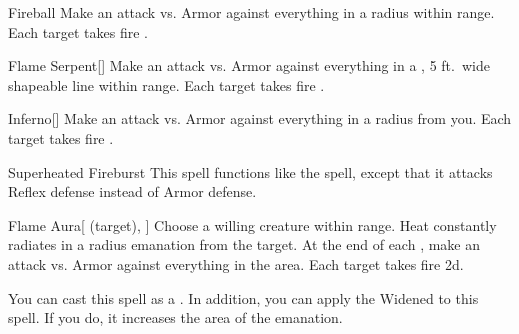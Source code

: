 \lowercase{\hypertarget{spell:Fireball}{}}\label{spell:Fireball}
\begin{ability}[\nth{3}]{\hypertarget{spell:Fireball}{Fireball}}
Make an attack vs. Armor against everything in a \areamed radius within \rngmed range.
\hit Each target takes fire .
\end{ability}
\vspace{0.25em}



\lowercase{\hypertarget{spell:Flame Serpent}{}}\label{spell:Flame Serpent}
\begin{ability}[\nth{3}]{\hypertarget{spell:Flame Serpent}{Flame Serpent}}[]
Make an attack vs. Armor against everything in a \arealarge, 5 ft.\ wide shapeable line within \rngmed range.
\hit Each target takes fire .
\end{ability}
\vspace{0.25em}



\lowercase{\hypertarget{spell:Inferno}{}}\label{spell:Inferno}
\begin{ability}[\nth{3}]{\hypertarget{spell:Inferno}{Inferno}}[]
Make an attack vs. Armor against everything in a \arealarge radius from you.
\hit Each target takes fire .
\end{ability}
\vspace{0.25em}



\lowercase{\hypertarget{spell:Superheated Fireburst}{}}\label{spell:Superheated Fireburst}
\begin{ability}[\nth{3}]{\hypertarget{spell:Superheated Fireburst}{Superheated Fireburst}}
This spell functions like the  spell, except that it attacks Reflex defense instead of Armor defense.
\end{ability}
\vspace{0.25em}



\lowercase{\hypertarget{spell:Flame Aura}{}}\label{spell:Flame Aura}
\begin{ability}[\nth{4}]{\hypertarget{spell:Flame Aura}{Flame Aura}}[ (target), ]
Choose a willing creature within \rngclose range.
Heat constantly radiates in a \areamed radius emanation from the target.
At the end of each , make an attack vs. Armor against everything in the area.
\hit Each target takes fire  \minus2d.

You can cast this spell as a .
In addition, you can apply the Widened  to this spell.
If you do, it increases the area of the emanation.
\end{ability}
\vspace{0.25em}



